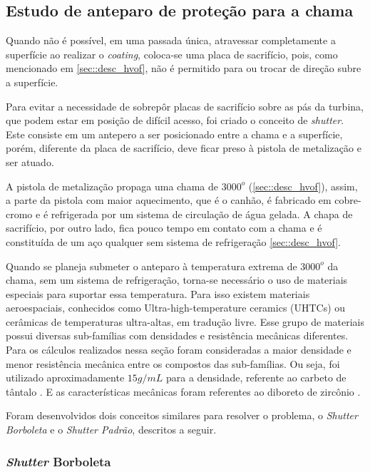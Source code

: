\subsection{Estudo de anteparo de proteção para a chama}
Quando não é possível, em uma passada única, atraves\-sar completamente a
superfície ao realizar o \textit{coating}, coloca-se uma placa de sacrifício, pois, como
menciona\-do em \ref{sec::desc_hvof}, não é permitido para ou trocar de direção
subre a superfície.

Para evitar a necessidade de sobrepôr placas de sacrifício sobre as pás da
turbina, que podem estar em posição de difícil acesso, foi criado o conceito de
\textit{shutter}. Este consiste em um antepero a ser posicionado entre a chama e
a superfície, porém, diferente da placa de sacrifício, deve ficar preso à
pistola de metalização e ser atuado.

A pistola de metalização propaga uma chama de $3000^o$ (\ref{sec::desc_hvof}), assim,
a parte da pistola com maior aquecimento, que é o canhão, é fabricado em
cobre-cromo e é refrigerada por um sistema de circulação de água
gelada. A chapa de sacrifício, por outro lado, fica pouco tempo em contato com
a chama e é constituída de um aço qualquer sem sistema de refrigeração
\ref{sec::desc_hvof}.

Quando se planeja submeter o anteparo à temperatu\-ra extrema de $3000^o$ da
chama, sem um sistema de refrigeração, torna-se necessário o uso de materia\-is
especiais para suportar essa temperatura. Para isso existem materiais
aeroespaciais, conhecidos como Ultra-high-temperature ceramics (UHTCs) ou
cerâmi\-cas de temperaturas ultra-altas, em tradução livre. Esse grupo de
materiais possui diversas sub-famílias com densidades e resistência mecânicas
diferentes. Para os cálculos realizados nessa seção foram consideradas a maior
densidade e menor resistência mecânica entre os compostos das sub-famílias. Ou
seja, foi utilizado aproximadamente \textbf{$15 g/mL$} para a densidade, referente ao
carbeto de tântalo \citep{bansal2005ceramic}. E as características mecânicas
foram referentes ao diboreto de zircônio \citep{diborides}.

Foram desenvolvidos dois conceitos similares para resolver o problema, o \textit{Shutter
Borboleta} e o \textit{Shutter Padrão}, descritos a seguir.

\subsubsection{\textit{Shutter} Borboleta}
\label{borboleta}

